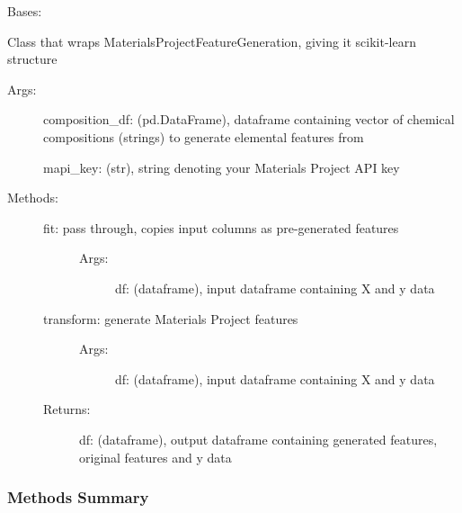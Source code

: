 \documentclass[letterpaper,10pt,english]{sphinxmanual}
\begin{document}
\begin{fulllineitems}
\label{\detokenize{api/mastml.feature_generators.MaterialsProjectFeatureGenerator:mastml.feature_generators.MaterialsProjectFeatureGenerator}}
Bases: {\hyperref[\detokenize{api/mastml.feature_generators.BaseGenerator:mastml.feature_generators.BaseGenerator}]{}}

Class that wraps MaterialsProjectFeatureGeneration, giving it scikit-learn structure
\begin{description}
\item[{Args:}] \leavevmode
composition\_df: (pd.DataFrame), dataframe containing vector of chemical compositions (strings) to generate elemental features from

mapi\_key: (str), string denoting your Materials Project API key

\item[{Methods:}] \leavevmode\begin{description}
\item[{fit: pass through, copies input columns as pre-generated features}] \leavevmode\begin{description}
\item[{Args:}] \leavevmode
df: (dataframe), input dataframe containing X and y data

\end{description}

\item[{transform: generate Materials Project features}] \leavevmode\begin{description}
\item[{Args:}] \leavevmode
df: (dataframe), input dataframe containing X and y data

\end{description}

\item[{Returns:}] \leavevmode
df: (dataframe), output dataframe containing generated features, original features and y data

\end{description}

\end{description}
\subsubsection*{Methods Summary}



\end{fulllineitems}
\end{document}
